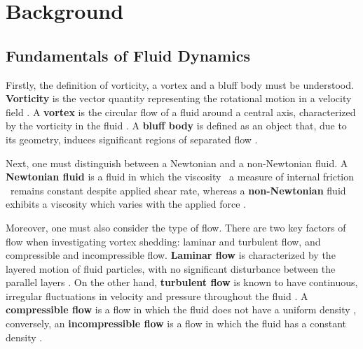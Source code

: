 \section{Background}

\subsection{Fundamentals of Fluid Dynamics}
Firstly, the definition of vorticity, a vortex and a bluff body must be understood. \textbf{Vorticity} is the vector quantity representing the rotational motion in a velocity field \parencite[p.~2500]{holton2003_vorticity}. A \textbf{vortex} is the circular flow of a fluid around a central axis, characterized by the vorticity in the fluid \parencite[p.~390]{nitsche2006_vortex}. A \textbf{bluff body} is defined as an object that, due to its geometry, induces significant regions of separated flow \parencite[p.~561]{navalhydro1997}. 

Next, one must distinguish between a Newtonian and a non-Newtonian fluid. A \textbf{Newtonian fluid} is a fluid in which the viscosity \textemdash\ a measure of internal friction \textemdash\ remains constant despite applied shear rate, whereas a \textbf{non-Newtonian} fluid exhibits a viscosity which varies with the applied force \parencite{mohn2024}. 

Moreover, one must also consider the type of flow. There are two key factors of flow when investigating vortex shedding: laminar and turbulent flow, and compressible and incompressible flow. \textbf{Laminar flow} is characterized by the layered motion of fluid particles, with no significant disturbance between the parallel layers \parencite[pp.~40--41]{versteeg2007}. On the other hand, \textbf{turbulent flow} is known to have continuous, irregular fluctuations in velocity and pressure throughout the fluid \parencite[p.~40]{versteeg2007}. A \textbf{compressible flow} is a flow in which the fluid does not have a uniform density \parencite[p.~31]{oran2002}, conversely, an \textbf{incompressible flow} is a flow in which the fluid has a constant density \parencite[p.~12]{versteeg2007}. 

